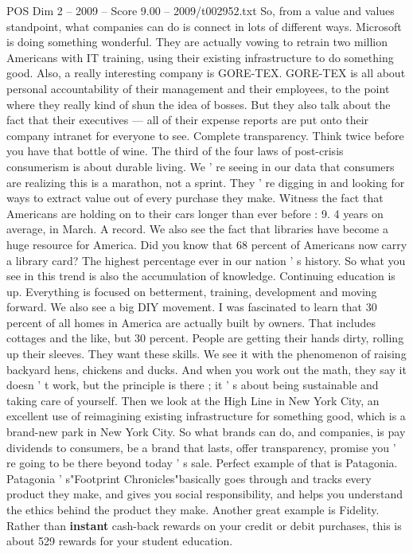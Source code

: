 \begin{textsample}{POS Dim 2 – 2009 – Score 9.00 – 2009/t002952.txt}
So, from a value and values standpoint, what companies can do is connect in lots of different ways.
Microsoft is doing something wonderful.
They are actually vowing to retrain two million Americans with IT training, using their existing infrastructure to do something good.
Also, a really interesting company is GORE-TEX.
GORE-TEX is all about personal accountability of their management and their employees, to the point where they really kind of shun the idea of bosses.
But they also talk about the fact that their executives — all of their expense reports are put onto their company intranet for everyone to see.
Complete transparency.
Think twice before you have that bottle of wine.
The third of the four laws of post-crisis consumerism is about durable living.
We ' re seeing in our data that consumers are realizing this is a marathon, not a sprint.
They ' re digging in and looking for ways to extract value out of every purchase they make.
Witness the fact that Americans are holding on to their cars longer than ever before : 9. 4 years on average, in March.
A record.
We also see the fact that libraries have become a huge resource for America.
Did you know that 68 percent of Americans now carry a library card?
The highest percentage ever in our nation ' s history.
So what you see in this trend is also the accumulation of knowledge.
Continuing education is up.
Everything is focused on betterment, training, development and moving forward.
We also see a big DIY movement.
I was fascinated to learn that 30 percent of all homes in America are actually built by owners.
That includes cottages and the like, but 30 percent.
People are getting their hands dirty, rolling up their sleeves.
They want these skills.
We see it with the phenomenon of raising backyard hens, chickens and ducks.
And when you work out the math, they say it doesn ' t work, but the principle is there ; it ' s about being sustainable and taking care of yourself.
Then we look at the High Line in New York City, an excellent use of reimagining existing infrastructure for something good, which is a brand-new park in New York City.
So what brands can do, and companies, is pay dividends to consumers, be a brand that lasts, offer transparency, promise you ' re going to be there beyond today ' s sale.
Perfect example of that is Patagonia.
Patagonia ' s"Footprint Chronicles"basically goes through and tracks every product they make, and gives you social responsibility, and helps you understand the ethics behind the product they make.
Another great example is Fidelity.
Rather than \textbf{instant} cash-back rewards on your credit or debit purchases, this is about 529 rewards for your student education.

\end{textsample}
